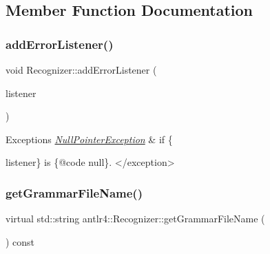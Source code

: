 \subsection{Member Function Documentation}
\mbox{\label{classantlr4_1_1Recognizer_a318b28305ce27bd8a6737d994c58cd71}} 
\subsubsection{\texorpdfstring{add\+Error\+Listener()}{addErrorListener()}}
{\footnotesize\ttfamily void Recognizer\+::add\+Error\+Listener (\begin{DoxyParamCaption}\item[{\hyperlink{classantlr4_1_1ANTLRErrorListener}{A\+N\+T\+L\+R\+Error\+Listener} $\ast$}]{listener }\end{DoxyParamCaption})\hspace{0.3cm}{\ttfamily [virtual]}}




\begin{DoxyExceptions}{Exceptions}
{\em \hyperlink{classantlr4_1_1NullPointerException}{Null\+Pointer\+Exception}} & if \{ \\
\hline
\end{DoxyExceptions}



\begin{DoxyCode}
listener\} is \{@code null\}. </exception> 
\end{DoxyCode}
\mbox{\label{classantlr4_1_1Recognizer_a41d77f1ad38c68b4208d26c070fd2cc7}} 
\subsubsection{\texorpdfstring{get\+Grammar\+File\+Name()}{getGrammarFileName()}}
{\footnotesize\ttfamily virtual std\+::string antlr4\+::\+Recognizer\+::get\+Grammar\+File\+Name (\begin{DoxyParamCaption}{ }\end{DoxyParamCaption}) const\hspace{0.3cm}{\ttfamily [pure virtual]}}




